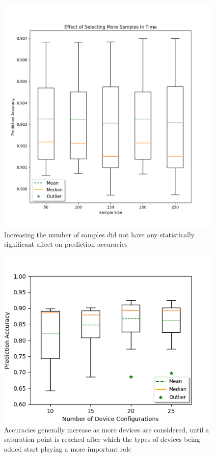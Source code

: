 \begin{figure}
	\centering
	\includegraphics[width=\columnwidth]{time_analysis.png}
	\caption{Increasing the number of samples did not have any statistically significant affect on prediction accuracies}
    \label{fig:umn_analysis}
\end{figure}

\begin{figure}
	\centering
	\includegraphics[width=\columnwidth]{device_analysis.png}
	\caption{Accuracies generally increase as more devices are considered, until a saturation point is reached after which the types of devices being added start playing a more important role}
    \label{fig:umn_analysis}
\end{figure}

